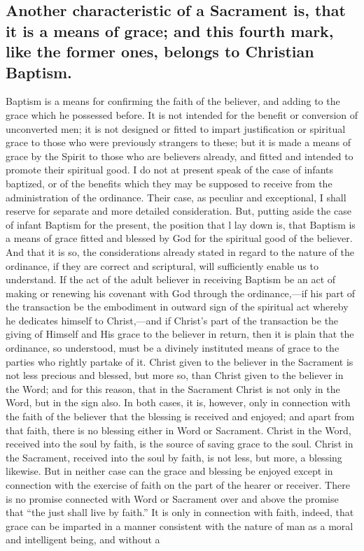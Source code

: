 \documentclass[english,]{book}
\begin{document}
\hypertarget{another-characteristic-of-a-sacrament-is-that-it-is-a-means-of-grace-and-this-fourth-mark-like-the-former-ones-belongs-to-christian-baptism.}{%
\subsection{Another characteristic of a Sacrament is, that it is a means of grace; and this fourth mark, like the former ones, belongs to Christian Baptism.}\label{another-characteristic-of-a-sacrament-is-that-it-is-a-means-of-grace-and-this-fourth-mark-like-the-former-ones-belongs-to-christian-baptism.}}

Baptism is a means for confirming the faith of the believer, and adding to the grace which he possessed before. It is not intended for the benefit or conversion of unconverted men; it is not designed or fitted to impart justification or spiritual grace to those who were previously strangers to these; but it is made a means of grace by the Spirit to those who are believers already, and fitted and intended to promote their spiritual good. I do not at present speak of the case of infants baptized, or of the benefits which they may be supposed to receive from the administration of the ordinance. Their case, as peculiar and exceptional, I shall reserve for separate and more detailed consideration. But, putting aside the case of infant Baptism for the present, the position that l lay down is, that Baptism is a means of grace fitted and blessed by God for the spiritual good of the believer. And that it is so, the considerations already stated in regard to the nature of the ordinance, if they are correct and scriptural, will sufficiently enable us to understand. If the act of the adult believer in receiving Baptism be an act of making or renewing his covenant with God through the ordinance,---if his part of the transaction be the embodiment in outward sign of the spiritual act whereby he dedicates himself to Christ,---and if Christ's part of the transaction be the giving of Himself and His grace to the believer in return, then it is plain that the ordinance, so understood, must be a divinely instituted means of grace to the parties who rightly partake of it. Christ given to the believer in the Sacrament is not less precious and blessed, but more so, than Christ given to the believer in the Word; and for this reason, that in the Sacrament Christ is not only in the Word, but in the sign also. In both cases, it is, however, only in connection with the faith of the believer that the blessing is received and enjoyed; and apart from that faith, there is no blessing either in Word or Sacrament. Christ in the Word, received into the soul by faith, is the source of saving grace to the soul. Christ in the Sacrament, received into the soul by faith, is not less, but more, a blessing likewise. But in neither case can the grace and blessing be enjoyed except in connection with the exercise of faith on the part of the hearer or receiver. There is no promise connected with Word or Sacrament over and above the promise that ``the just shall live by faith.'' It is only in connection with faith, indeed, that grace can be imparted in a manner consistent with the nature of man as a moral and intelligent being, and without a 
\end{document}
